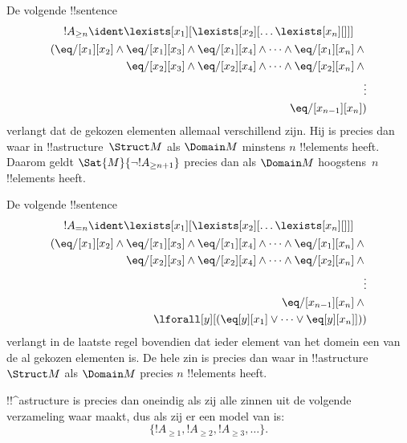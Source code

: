 \documentclass[openany]{memoir}
\begin{document}
\begin{prop}
De volgende !!{sentence}
\begin{multline*}
  !A_{\ge n} \ident \lexists[x_1][\lexists[x_2][\dots\lexists[x_n][{}]]]\\
  \begin{aligned}
  (\eq/[x_1][x_2] \land {}
  \eq/[x_1][x_3] \land \eq/[x_1][x_4] \land \dots \land \eq/[x_1][x_n] \land {}\\
\eq/[x_2][x_3] \land \eq/[x_2][x_4] \land \dots \land {} \eq/[x_2][x_n] \land {} \\
\vdots\\
\eq/[x_{n-1}][x_n])
\end{aligned}
\end{multline*}
verlangt dat de gekozen elementen allemaal verschillend zijn. Hij is
precies dan waar in !!a{structure}~$\Struct M$ als $\Domain M$
minstens $n$ !!{element}s heeft. Daarom geldt
$\Sat{M}{\lnot !A_{\ge n+1}}$ precies dan als $\Domain M$
hoogstens~$n$ !!{element}s heeft.

\end{prop}

\begin{prop}
De volgende !!{sentence}
\begin{multline*}
!A_{= n} \ident \lexists[x_1][\lexists[x_2][\dots\lexists[x_n][{}]]] \\
\begin{aligned}
  (\eq/[x_1][x_2] \land {}
  \eq/[x_1][x_3] \land \eq/[x_1][x_4] \land \dots \land \eq/[x_1][x_n] \land {}\\
\eq/[x_2][x_3] \land \eq/[x_2][x_4] \land \dots \land {} \eq/[x_2][x_n] \land {} \\
\vdots\\
\eq/[x_{n-1}][x_n] \land {} \\
\lforall[y][(\eq[y][x_1] \lor \dots \lor \eq[y][x_n]]))
\end{aligned}
\end{multline*}
verlangt in de laatste regel bovendien dat ieder element van het
domein een van de al gekozen elementen is. De hele zin is precies dan
waar in !!a{structure}~$\Struct M$ als $\Domain M$ precies $n$
!!{element}s heeft.
\end{prop}

\begin{prop}
!!^a{structure} is precies dan oneindig als zij alle zinnen uit de
volgende verzameling waar maakt, dus als zij er een model van is:
\[
\{!A_{\ge 1}, !A_{\ge 2}, !A_{\ge 3}, \dots \}.
\]
\end{prop}
\end{document}
